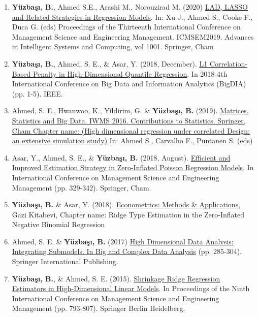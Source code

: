 \documentclass[10pt,letterpaper]{article}
\newenvironment{etaremune}{\begin{enumerate}}{\end{enumerate}}
\begin{document}
\begin{etaremune}
\item {\bf Y\"{u}zba\c{s}{\i}, B.}, Ahmed S.E., Arashi M., Norouzirad M. (2020) \href{https://link.springer.com/chapter/10.1007/978-3-030-21248-3_32}{LAD, LASSO and Related Strategies in Regression Models}. In: Xu J., Ahmed S., Cooke F., Duca G. (eds) Proceedings of the Thirteenth International Conference on Management Science and Engineering Management. ICMSEM2019. Advances in Intelligent Systems and Computing, vol 1001. Springer, Cham



\item {\bf Y\"{u}zba\c{s}{\i}, B.}, Ahmed, S. E., \& Asar, Y. (2018, December). \href{https://ieeexplore.ieee.org/document/8632795}{L1 Correlation-Based Penalty in High-Dimensional Quantile Regression}. In 2018 4th International Conference on Big Data and Information Analytics (BigDIA) (pp. 1-5). IEEE.


 \item  Ahmed, S. E., Hwanwoo, K., Yildirim, G. \& {\bf Y\"{u}zba\c{s}{\i}, B.} (2019). \href{https://link.springer.com/chapter/10.1007/978-3-030-17519-1_11}{Matrices, Statistics and Big Data. IWMS 2016. Contributions to Statistics. Springer, Cham Chapter name: (High dimensional regression under correlated Design: an extensive simulation study)} In: Ahmed S., Carvalho F., Puntanen S. (eds)
 

 
 

 \item  Asar, Y., Ahmed, S. E., \& {\bf Y\"{u}zba\c{s}{\i}, B.} (2018, August). \href{https://link.springer.com/chapter/10.1007/978-3-319-93351-1_27}{Efficient and Improved Estimation Strategy in Zero-Inflated Poisson Regression Models}. In International Conference on Management Science and Engineering Management (pp. 329-342). Springer, Cham.


 \item  {\bf Y\"{u}zba\c{s}{\i}, B.}  \& Asar, Y. (2018). \href{https://www.gazikitabevi.com.tr/urun/econometrics-methods-applications}{Econometrics: Methods \& Applications}, Gazi Kitabevi, Chapter name: Ridge Type Estimation in the Zero-Inflated Negative Binomial Regression






\item Ahmed, S. E. \& {\bf Y\"{u}zba\c{s}{\i}, B.} (2017) 
\href{https://link.springer.com/chapter/10.1007\%2F978-3-319-41573-4_14}
{High Dimensional Data Analysis: Integrating Submodels. In Big and Complex Data Analysis} (pp. 285-304). 
Springer International Publishing.


 \item {\bf Y\"{u}zba\c{s}{\i}, B.}, \& Ahmed, S. E. (2015). 
 \href{https://link.springer.com/chapter/10.1007/978-3-662-47241-5_67}
 {Shrinkage Ridge Regression Estimators in High-Dimensional Linear Models}. 
 In Proceedings of the Ninth International Conference on Management Science and Engineering Management (pp. 793-807). 
 Springer Berlin Heidelberg.
 

 
 
\end{etaremune}
\end{document}
